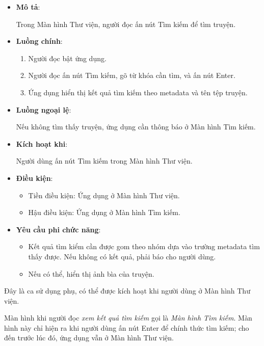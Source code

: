 \documentclass[../../thesis]{subfiles}
\begin{document}
\begin{itemize}
    \item
        \textbf{Mô tả}:

        Trong Màn hình Thư viện, người đọc ấn nút Tìm kiếm để tìm truyện.
    \item
        \textbf{Luồng chính}:

        \begin{enumerate}
            \item
                Người đọc bật ứng dụng.
            \item
                Người đọc ấn nút Tìm kiếm, gõ từ khóa cần tìm, và ấn nút Enter.
            \item
                Ứng dụng hiển thị kết quả tìm kiếm theo metadata và tên tệp
                truyện.
        \end{enumerate}
    \item
        \textbf{Luồng ngoại lệ}:

        Nếu không tìm thấy truyện, ứng dụng cần thông báo ở Màn hình Tìm kiếm.
    \item
        \textbf{Kích hoạt khi}:

        Người dùng ấn nút Tìm kiếm trong Màn hình Thư viện.
    \item
        \textbf{Điều kiện}:

        \begin{itemize}
            \item
                Tiền điều kiện: Ứng dụng ở Màn hình Thư viện.
            \item
                Hậu điều kiện: Ứng dụng ở Màn hình Tìm kiếm.
        \end{itemize}
    \item
        \textbf{Yêu cầu phi chức năng}:

        \begin{itemize}
            \item
                Kết quả tìm kiểm cần được gom theo nhóm dựa vào trường metadata
                tìm thấy được. Nếu không có kết quả, phải báo cho người dùng.
            \item
                Nếu có thể, hiển thị ảnh bìa của truyện.
        \end{itemize}
\end{itemize}

Đây là ca sử dụng phụ, có thể được kích hoạt khi người dùng ở Màn hình Thư viện.

Màn hình khi người đọc \emph{xem kết quả tìm kiếm} gọi là \emph{Màn hình Tìm
kiếm}. Màn hình này chỉ hiện ra khi người dùng ấn nút Enter để chính thức tìm
kiếm; cho đến trước lúc đó, ứng dụng vẫn ở Màn hình Thư viện.
\end{document}
